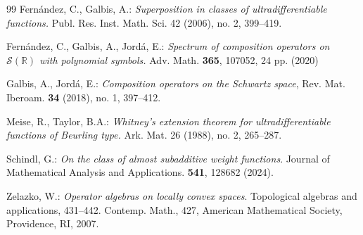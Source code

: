 \documentclass[12pt,reqno]{amsart} %
\numberwithin{equation}{section}
\begin{document}
\begin{thebibliography}{99}
					 Fern\'andez, C., Galbis, A.: \emph{Superposition in classes of ultradifferentiable functions.} Publ. Res. Inst. Math. Sci. 42 (2006), no. 2, 399--419.
					
					
					  Fern\'andez, C.,  Galbis, A.,  Jord\'a, E.: {\em Spectrum of composition operators on ${\mathcal S}({\mathbb R})$ with polynomial symbols.} Adv. Math. {\bf 365}, 107052, 24 pp. (2020)
					
					  Galbis, A., Jord\'a, E.: \textit{Composition operators on the Schwartz space}, Rev. Mat. Iberoam. {\bf 34} (2018), no. 1, 397--412.
					
					
					 Meise, R., Taylor, B.A.: \emph{Whitney's extension theorem for ultradifferentiable functions of Beurling type.} Ark. Mat. 26 (1988), no. 2, 265--287.
					
					
					  Schindl, G.: {\em On the class of almost subadditive weight functions}. Journal of Mathematical Analysis and Applications. {\bf 541}, 128682 (2024).
					
					 Zelazko, W.: {\em Operator algebras on locally convex spaces}. Topological algebras and applications, 431--442. Contemp. Math., 427, American Mathematical Society, Providence, RI, 2007.
					
				\end{thebibliography}
				
				
\end{document}
